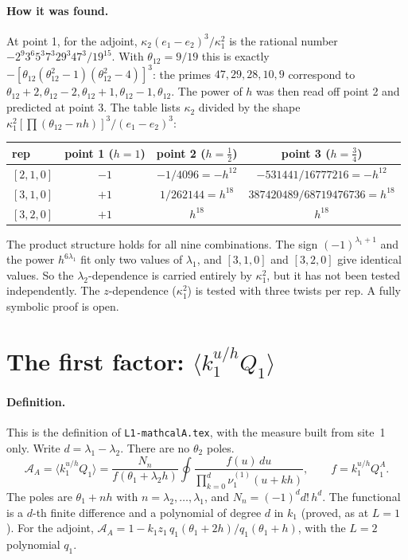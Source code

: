 \documentclass[11pt]{article}
\newcommand{\nb}[1]{\texttt{#1}}
\theoremstyle{definition}
\theoremstyle{remark}
\begin{document}
\paragraph{How it was found.}
At point 1, for the adjoint, $\kappa_2(e_1-e_2)^3/\kappa_1^2$ is the rational number $-2^9 3^6 5^3 7^3 29^3 47^3/19^{15}$. With $\theta_{12}=9/19$ this is exactly $-[\theta_{12}(\theta_{12}^2-1)(\theta_{12}^2-4)]^3$: the primes $47,29,28,10,9$ correspond to $\theta_{12}+2,\theta_{12}-2,\theta_{12}+1,\theta_{12}-1,\theta_{12}$. The power of $h$ was then read off point 2 and predicted at point 3. The table lists $\kappa_2$ divided by the shape $\kappa_1^2[\prod(\theta_{12}-nh)]^3/(e_1-e_2)^3$:
\begin{center}
\begin{tabular}{lccc}\toprule
rep & point 1 ($h=1$) & point 2 ($h=\tfrac12$) & point 3 ($h=\tfrac34$)\\\midrule
$[2,1,0]$ & $-1$ & $-1/4096=-h^{12}$ & $-531441/16777216=-h^{12}$\\
$[3,1,0]$ & $+1$ & $1/262144=h^{18}$ & $387420489/68719476736=h^{18}$\\
$[3,2,0]$ & $+1$ & $h^{18}$ & $h^{18}$\\\bottomrule
\end{tabular}
\end{center}
The product structure holds for all nine combinations. The sign $(-1)^{\lambda_1+1}$ and the power $h^{6\lambda_1}$ fit only two values of $\lambda_1$, and $[3,1,0]$ and $[3,2,0]$ give identical values. So the $\lambda_2$-dependence is carried entirely by $\kappa_1^2$, but it has not been tested independently. The $z$-dependence ($\kappa_1^2$) is tested with three twists per rep. A fully symbolic proof is open.

\section{The first factor: $\langle k_1^{u/h}Q_1\rangle$}\label{sec:first}

\paragraph{Definition.}
This is the definition of \nb{L1-mathcalA.tex}, with the measure built from site~1 only. Write $d=\lambda_1-\lambda_2$. There are no $\theta_2$ poles.
\begin{equation}
\mathcal A_A=\langle k_1^{u/h}Q_1\rangle=\frac{N_n}{f(\theta_1+\lambda_2h)}\oint\frac{f(u)\,du}{\prod_{k=0}^{d}\nu^{(1)}_1(u+kh)},\qquad f=k_1^{u/h}Q_1^A .
\end{equation}
The poles are $\theta_1+nh$ with $n=\lambda_2,\dots,\lambda_1$, and $N_n=(-1)^dd!\,h^d$. The functional is a $d$-th finite difference and a polynomial of degree $d$ in $k_1$ (proved, as at $L=1$). For the adjoint, $\mathcal A_A=1-k_1z_1\,q_1(\theta_1+2h)/q_1(\theta_1+h)$, with the $L=2$ polynomial $q_1$.
\end{document}
